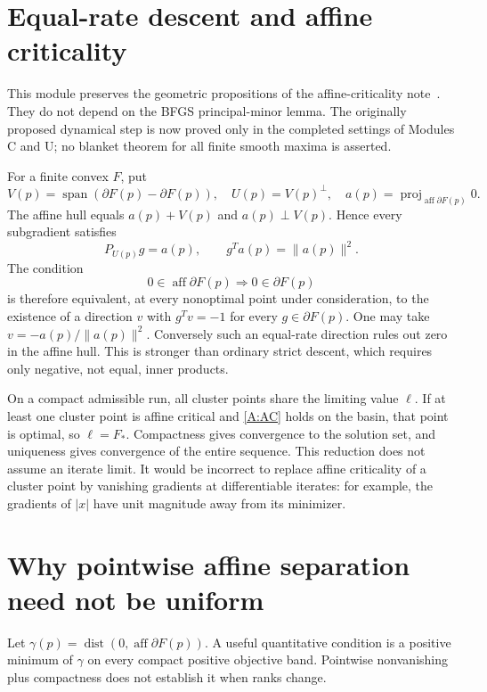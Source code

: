 \section{Equal-rate descent and affine criticality}
This module preserves the geometric propositions of the affine-criticality note~\cite{SA}. They do not depend on the BFGS principal-minor lemma. The originally proposed dynamical step is now proved only in the completed settings of Modules C and U; no blanket theorem for all finite smooth maxima is asserted.

For a finite convex $F$, put
\[
 V(p)=\operatorname{span}(\partial F(p)-\partial F(p)),\quad U(p)=V(p)^\perp,
 \quad a(p)=\operatorname{proj}_{\operatorname{aff}\partial F(p)}0.
\]
The affine hull equals $a(p)+V(p)$ and $a(p)\perp V(p)$. Hence every subgradient satisfies
\[
 P_{U(p)}g=a(p),\qquad g^Ta(p)=\|a(p)\|^2.
\]
The condition
\begin{equation}\label{A:AC}
 0\in\operatorname{aff}\partial F(p)\Longrightarrow0\in\partial F(p)
\end{equation}
is therefore equivalent, at every nonoptimal point under consideration, to the existence of a direction $v$ with $g^Tv=-1$ for every $g\in\partial F(p)$. One may take $v=-a(p)/\|a(p)\|^2$. Conversely such an equal-rate direction rules out zero in the affine hull. This is stronger than ordinary strict descent, which requires only negative, not equal, inner products.

On a compact admissible run, all cluster points share the limiting value $\ell$. If at least one cluster point is affine critical and \eqref{A:AC} holds on the basin, that point is optimal, so $\ell=F_*$. Compactness gives convergence to the solution set, and uniqueness gives convergence of the entire sequence. This reduction does not assume an iterate limit. It would be incorrect to replace affine criticality of a cluster point by vanishing gradients at differentiable iterates: for example, the gradients of $|x|$ have unit magnitude away from its minimizer.

\section{Why pointwise affine separation need not be uniform}
Let $\gamma(p)=\operatorname{dist}(0,\operatorname{aff}\partial F(p))$. A useful quantitative condition is a positive minimum of $\gamma$ on every compact positive objective band. Pointwise nonvanishing plus compactness does not establish it when ranks change.

